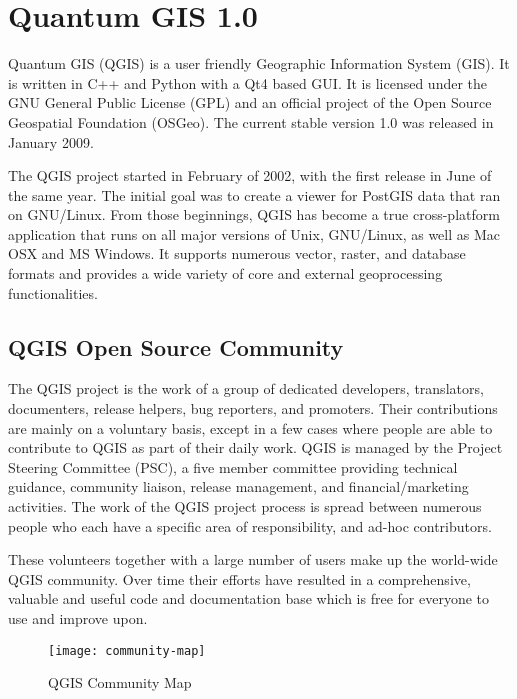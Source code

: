 \section{Quantum GIS 1.0}
\setcounter{page}{1}

Quantum GIS (QGIS) is a user friendly Geographic Information System (GIS).
It is written in C++ and Python with a Qt4 based GUI. It is licensed under the
GNU General Public License (GPL) and an official project of the Open Source
Geospatial Foundation (OSGeo). The current stable version 1.0 was released in
January 2009. 


The QGIS project started in February of 2002, with the first release in June
of the same year. The initial goal was to create a viewer for PostGIS data
that ran on GNU/Linux. From those beginnings, QGIS has become a true
cross-platform application that runs on all major versions of Unix,
GNU/Linux, as well as Mac OSX and MS Windows. It supports numerous vector,
raster, and database formats and provides a wide variety of core and external
geoprocessing functionalities.

\subsection{QGIS Open Source Community}

The QGIS project is the work of a group of dedicated developers,
translators, documenters, release helpers, bug reporters, and promoters. Their 
contributions are mainly on a voluntary basis, except in a few cases where 
people are able to contribute to QGIS as part of their daily work. QGIS 
is managed by the Project Steering Committee (PSC), a five member committee
providing technical guidance, community liaison, release management, and
financial/marketing activities. The work of the QGIS project process is
spread between numerous people who each have a specific area of
responsibility, and ad-hoc contributors.

These volunteers together with a large number of users make up the
world-wide QGIS community. Over time their efforts have resulted in a
comprehensive,
valuable and useful code and documentation base which is free for everyone 
to use and improve upon.

\begin{figure}[h]
   \begin{center}
   \caption{QGIS Community Map}\label{fig:community-map}\smallskip
   \texttt{[image: community-map]}
\end{center}
\end{figure}

